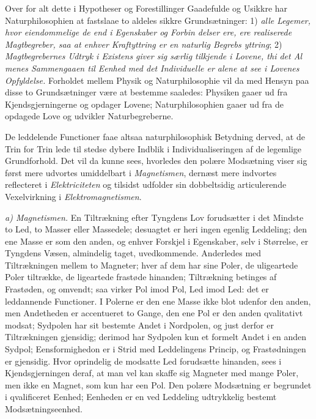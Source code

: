 \documentclass[12pt,a4paper]{book}
\newcommand{\runin}[1]{\emph{#1}\hspace{0.4em}}
\begin{document}
Over for alt dette i Hypotheser og Forestillinger Gaadefulde og
Usikkre har Naturphilosophien at fastslaae to aldeles sikkre
Grundsætninger: 1) \emph{alle Legemer, hvor eiendommelige de end i
Egenskaber og Forbin\-%
delser ere, ere realiserede Magtbegreber, saa at enhver Kraftyttring
er en naturlig Begrebs\-%
yttring}; 2) \emph{Magtbegrebernes Udtryk i Existens giver sig særlig
tilkjende i Lovene, thi det Al\-%
menes Sammengaaen til Eenhed med det Individuelle er alene at see i
Lovenes Opfyldelse.} Forholdet mellem Physik og Naturphilosophie vil
da med Hensyn paa disse to Grundsætninger være at bestemme saaledes:
Physiken gaaer ud fra Kjendsgjerningerne og opdager Lovene;
Naturphilosophien gaaer ud fra de opdagede Love og udvikler
Naturbegreberne.

De leddelende Functioner faae altsaa naturphilosophisk Betydning
derved, at de Trin for Trin lede til stedse dybere Indblik i
Individualiseringen af de legemlige Grundforhold. Det vil da kunne
sees, hvorledes den polære Modsætning viser sig først mere udvortes
umiddelbart i \emph{Magnetismen}, dernæst mere indvortes reflecteret i
\emph{Elektriciteten} og tilsidst udfolder sin dobbeltsidig
articulerende Vexelvirkning i \emph{Elektromagnetismen}.

\runin{a) Magnetismen.} En Tiltrækning efter Tyngdens Lov forudsætter
i det Mindste to Led, to Masser eller Massedele; desuagtet er heri
ingen egenlig Leddeling; den ene Masse er som den anden, og enhver
Forskjel i Egenskaber, selv i Størrelse, er Tyngdens Væsen,
almindelig taget, uvedkommende. Anderledes med Tiltrækningen mellem to
Magneter; hver af dem har sine Poler, de uligeartede Poler tiltrække,
de ligeartede frastøde hinanden; Tiltrækning betinges af Frastøden, og
omvendt; saa virker Pol imod Pol, Led imod Led: det er leddannende
Functioner. I Polerne er den ene Masse ikke blot udenfor den anden,
men Andetheden er accentueret to Gange, den ene Pol er den anden
qvalitativt modsat; Sydpolen har sit bestemte Andet i Nordpolen, og
just derfor er Tiltrækningen gjensidig; derimod har Sydpolen kun et
formelt Andet i en anden Sydpol; Eensformighedon er i Strid med
Leddelingens Princip, og Frastødningen er gjensidig. Hvor oprindelig
de modsatte Led forudsætte hinanden, sees i Kjendsgjerningen deraf, at
man vel kan skaffe sig Magneter
med mange Poler, men ikke en Magnet, som kun har een Pol. Den polære
Modsætning er begrundet i qvalificeret Eenhed; Eenheden er en ved
Leddeling udtrykkelig bestemt Modsætningseenhed.
\end{document}
